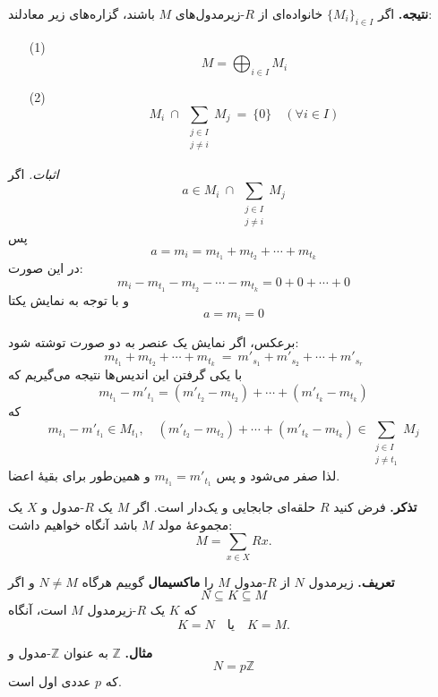 \textbf{نتیجه.} اگر $\{M_i\}_{i \in I}$ خانواده‌ای از $R$-زیرمدول‌های $M$ باشند، گزاره‌های زیر معادلند:
\begin{enumerate}
    \item[(1)]
          \[
              M = \bigoplus_{i \in I} M_i
          \]
    \item[(2)]
          \[
              M_i \ \cap \ \sum_{\substack{j \in I \\ j \neq i}} M_j \ = \ \{0\} \quad (\forall i \in I)
          \]
\end{enumerate}

\textit{اثبات.}
اگر
\[
    a \in M_i \ \cap \ \sum_{\substack{j \in I \\ j \neq i}} M_j
\]
پس
\[
    a = m_i = m_{t_1} + m_{t_2} + \cdots + m_{t_k}
\]
در این صورت:
\[
    m_i - m_{t_1} - m_{t_2} - \cdots - m_{t_k} = 0 + 0 + \cdots + 0
\]
و با توجه به نمایش یکتا
$$a = m_i = 0$$

برعکس، اگر نمایش یک عنصر به‌ دو صورت توشته شود:
\[
    m_{t_1} + m_{t_2} + \cdots + m_{t_k} \ = \ m'_{s_1} + m'_{s_2} + \cdots + m'_{s_r}
\]
با یکی گرفتن این اندیس‌ها نتیجه می‌گیریم که
\[
m_{t_1} - m'_{t_1} 
= (m'_{t_2} - m_{t_2}) + \cdots + (m'_{t_k} - m_{t_k})
\]
که
\[
m_{t_1} - m'_{t_1} \in M_{t_1}, 
\quad 
(m'_{t_2} - m_{t_2}) + \cdots + (m'_{t_k} - m_{t_k}) 
\in \sum_{\substack{j \in I \\ j \neq t_1}} M_j
\]
لذا صفر می‌شود و پس $m_{t_1} = m'_{t_1}$ و همین‌طور برای بقیهٔ اعضا.

\hrulefill

\textbf{تذکر.}  
فرض کنید 
\(R\)
حلقه‌ای جابجایی و یک‌دار است.
اگر $M$ یک $R$-مدول و $X$ یک مجموعهٔ مولد $M$ باشد آنگاه خواهیم داشت:
\[
M = \sum_{x \in X} Rx.
\]

\hrulefill

\textbf{تعریف.}  
زیرمدول $N$ از $R$-مدول $M$ را \textbf{ماکسیمال} گوییم هرگاه $N \neq M$ و اگر 
\[
N \subseteq K \subseteq M
\]
که $K$ یک $R$-زیرمدول $M$ است، آنگاه 
\[
K = N \quad \text{یا} \quad K = M.
\]

\textbf{مثال.}  
$\mathbb{Z}$ به عنوان $\mathbb{Z}$-مدول و 
\[
N = p\mathbb{Z}
\]
که $p$ عددی اول است.
